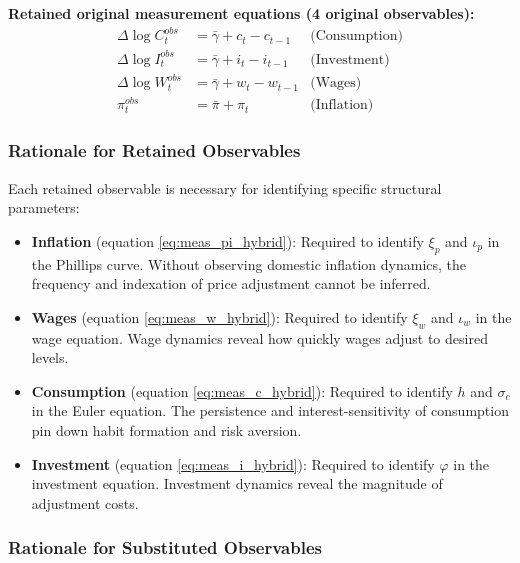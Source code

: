 \documentclass[12pt]{article}
\begin{document}
\textbf{Retained original measurement equations (4 original observables):}
\begin{align}
\Delta\log C_t^{obs} &= \bar{\gamma} + c_t - c_{t-1} & \text{(Consumption)} \label{eq:meas_c_hybrid}\\
\Delta\log I_t^{obs} &= \bar{\gamma} + i_t - i_{t-1} & \text{(Investment)} \label{eq:meas_i_hybrid}\\
\Delta\log W_t^{obs} &= \bar{\gamma} + w_t - w_{t-1} & \text{(Wages)} \label{eq:meas_w_hybrid}\\
\pi_t^{obs} &= \bar{\pi} + \pi_t & \text{(Inflation)} \label{eq:meas_pi_hybrid}
\end{align}

\subsubsection{Rationale for Retained Observables}

Each retained observable is necessary for identifying specific structural parameters:

\begin{itemize}
    \item \textbf{Inflation} (equation \ref{eq:meas_pi_hybrid}): Required to identify $\xi_p$ and $\iota_p$ in the Phillips curve. Without observing domestic inflation dynamics, the frequency and indexation of price adjustment cannot be inferred.
    
    \item \textbf{Wages} (equation \ref{eq:meas_w_hybrid}): Required to identify $\xi_w$ and $\iota_w$ in the wage equation. Wage dynamics reveal how quickly wages adjust to desired levels.
    
    \item \textbf{Consumption} (equation \ref{eq:meas_c_hybrid}): Required to identify $h$ and $\sigma_c$ in the Euler equation. The persistence and interest-sensitivity of consumption pin down habit formation and risk aversion.
    
    \item \textbf{Investment} (equation \ref{eq:meas_i_hybrid}): Required to identify $\varphi$ in the investment equation. Investment dynamics reveal the magnitude of adjustment costs.
\end{itemize}

\subsubsection{Rationale for Substituted Observables}
\end{document}
